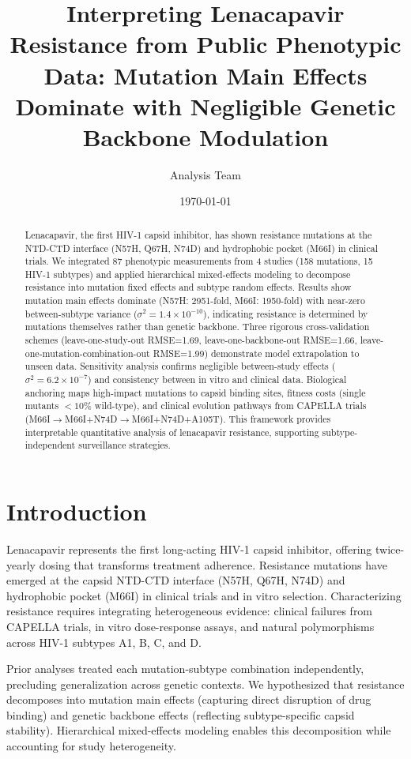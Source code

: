 \documentclass[11pt]{article}
\title{Interpreting Lenacapavir Resistance from Public Phenotypic Data: Mutation Main Effects Dominate with Negligible Genetic Backbone Modulation}
\author{Analysis Team}
\date{\today}
\begin{document}
\maketitle

\begin{abstract}
Lenacapavir, the first HIV-1 capsid inhibitor, has shown resistance mutations at the NTD-CTD interface (N57H, Q67H, N74D) and hydrophobic pocket (M66I) in clinical trials. We integrated 87 phenotypic measurements from 4 studies (158 mutations, 15 HIV-1 subtypes) and applied hierarchical mixed-effects modeling to decompose resistance into mutation fixed effects and subtype random effects. Results show mutation main effects dominate (N57H: 2951-fold, M66I: 1950-fold) with near-zero between-subtype variance ($\sigma^2=1.4\times10^{-10}$), indicating resistance is determined by mutations themselves rather than genetic backbone. Three rigorous cross-validation schemes (leave-one-study-out RMSE=1.69, leave-one-backbone-out RMSE=1.66, leave-one-mutation-combination-out RMSE=1.99) demonstrate model extrapolation to unseen data. Sensitivity analysis confirms negligible between-study effects ($\sigma^2=6.2\times10^{-7}$) and consistency between in vitro and clinical data. Biological anchoring maps high-impact mutations to capsid binding sites, fitness costs (single mutants $<10\%$ wild-type), and clinical evolution pathways from CAPELLA trials (M66I$\rightarrow$M66I+N74D$\rightarrow$M66I+N74D+A105T). This framework provides interpretable quantitative analysis of lenacapavir resistance, supporting subtype-independent surveillance strategies.
\end{abstract}

\section{Introduction}

Lenacapavir represents the first long-acting HIV-1 capsid inhibitor, offering twice-yearly dosing that transforms treatment adherence. Resistance mutations have emerged at the capsid NTD-CTD interface (N57H, Q67H, N74D) and hydrophobic pocket (M66I) in clinical trials and in vitro selection. Characterizing resistance requires integrating heterogeneous evidence: clinical failures from CAPELLA trials, in vitro dose-response assays, and natural polymorphisms across HIV-1 subtypes A1, B, C, and D.

Prior analyses treated each mutation-subtype combination independently, precluding generalization across genetic contexts. We hypothesized that resistance decomposes into mutation main effects (capturing direct disruption of drug binding) and genetic backbone effects (reflecting subtype-specific capsid stability). Hierarchical mixed-effects modeling enables this decomposition while accounting for study heterogeneity.
\end{document}
